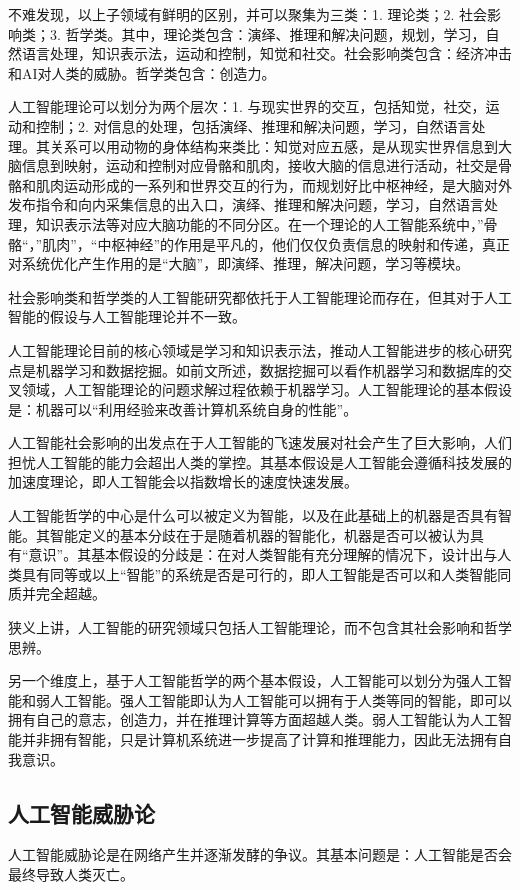\documentclass[fontset=fandol,UTF8]{article}
\begin{document}
不难发现，以上子领域有鲜明的区别，并可以聚集为三类：1. 理论类；2. 社会影响类；3. 哲学类。其中，理论类包含：演绎、推理和解决问题，规划，学习，自然语言处理，知识表示法，运动和控制，知觉和社交。社会影响类包含：经济冲击和AI对人类的威胁。哲学类包含：创造力。

人工智能理论可以划分为两个层次：1. 与现实世界的交互，包括知觉，社交，运动和控制；2. 对信息的处理，包括演绎、推理和解决问题，学习，自然语言处理。其关系可以用动物的身体结构来类比：知觉对应五感，是从现实世界信息到大脑信息到映射，运动和控制对应骨骼和肌肉，接收大脑的信息进行活动，社交是骨骼和肌肉运动形成的一系列和世界交互的行为，而规划好比中枢神经，是大脑对外发布指令和向内采集信息的出入口，演绎、推理和解决问题，学习，自然语言处理，知识表示法等对应大脑功能的不同分区。在一个理论的人工智能系统中，”骨骼“，”肌肉”，“中枢神经”的作用是平凡的，他们仅仅负责信息的映射和传递，真正对系统优化产生作用的是“大脑”，即演绎、推理，解决问题，学习等模块。

社会影响类和哲学类的人工智能研究都依托于人工智能理论而存在，但其对于人工智能的假设与人工智能理论并不一致。

人工智能理论目前的核心领域是学习和知识表示法，推动人工智能进步的核心研究点是机器学习和数据挖掘。如前文所述，数据挖掘可以看作机器学习和数据库的交叉领域，人工智能理论的问题求解过程依赖于机器学习。人工智能理论的基本假设是：机器可以“利用经验来改善计算机系统自身的性能”\cite{ml}。

人工智能社会影响的出发点在于人工智能的飞速发展对社会产生了巨大影响，人们担忧人工智能的能力会超出人类的掌控。其基本假设是人工智能会遵循科技发展的加速度理论，即人工智能会以指数增长的速度快速发展。

人工智能哲学的中心是什么可以被定义为智能，以及在此基础上的机器是否具有智能。其智能定义的基本分歧在于是随着机器的智能化，机器是否可以被认为具有“意识”。其基本假设的分歧是：在对人类智能有充分理解的情况下，设计出与人类具有同等或以上“智能”的系统是否是可行的，即人工智能是否可以和人类智能同质并完全超越。

狭义上讲，人工智能的研究领域只包括人工智能理论，而不包含其社会影响和哲学思辨。

另一个维度上，基于人工智能哲学的两个基本假设，人工智能可以划分为强人工智能和弱人工智能。强人工智能即认为人工智能可以拥有于人类等同的智能，即可以拥有自己的意志，创造力，并在推理计算等方面超越人类。弱人工智能认为人工智能并非拥有智能，只是计算机系统进一步提高了计算和推理能力，因此无法拥有自我意识。

\subsection{人工智能威胁论}
人工智能威胁论是在网络产生并逐渐发酵的争议。其基本问题是：人工智能是否会最终导致人类灭亡。
\end{document}
